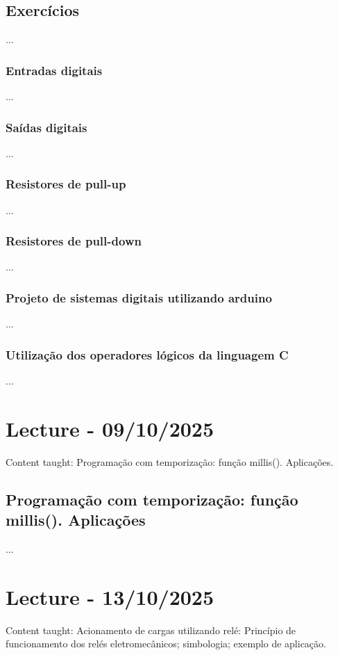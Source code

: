 \documentclass{article}
\begin{document}
\subsection{Exercícios}
...

\subsubsection{Entradas digitais}
...

\subsubsection{Saídas digitais}
...

\subsubsection{Resistores de pull-up}
...

\subsubsection{Resistores de pull-down}
...

\subsubsection{Projeto de sistemas digitais utilizando arduino}
...

\subsubsection{Utilização dos operadores lógicos da linguagem C}
...


\section{Lecture - 09/10/2025}
Content taught: Programação com temporização: função millis(). Aplicações.

\subsection{Programação com temporização: função millis(). Aplicações}
...

\section{Lecture - 13/10/2025}
Content taught: Acionamento de cargas utilizando relé: Princípio de funcionamento dos relés eletromecânicos; simbologia; exemplo de aplicação.
\end{document}

